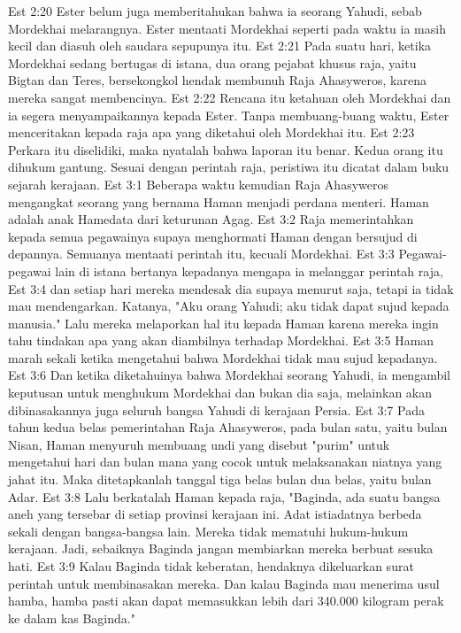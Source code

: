 Est 2:20  Ester belum juga memberitahukan bahwa ia seorang Yahudi, sebab Mordekhai melarangnya. Ester mentaati Mordekhai seperti pada waktu ia masih kecil dan diasuh oleh saudara sepupunya itu.
Est 2:21  Pada suatu hari, ketika Mordekhai sedang bertugas di istana, dua orang pejabat khusus raja, yaitu Bigtan dan Teres, bersekongkol hendak membunuh Raja Ahasyweros, karena mereka sangat membencinya.
Est 2:22  Rencana itu ketahuan oleh Mordekhai dan ia segera menyampaikannya kepada Ester. Tanpa membuang-buang waktu, Ester menceritakan kepada raja apa yang diketahui oleh Mordekhai itu.
Est 2:23  Perkara itu diselidiki, maka nyatalah bahwa laporan itu benar. Kedua orang itu dihukum gantung. Sesuai dengan perintah raja, peristiwa itu dicatat dalam buku sejarah kerajaan.
Est 3:1  Beberapa waktu kemudian Raja Ahasyweros mengangkat seorang yang bernama Haman menjadi perdana menteri. Haman adalah anak Hamedata dari keturunan Agag.
Est 3:2  Raja memerintahkan kepada semua pegawainya supaya menghormati Haman dengan bersujud di depannya. Semuanya mentaati perintah itu, kecuali Mordekhai.
Est 3:3  Pegawai-pegawai lain di istana bertanya kepadanya mengapa ia melanggar perintah raja,
Est 3:4  dan setiap hari mereka mendesak dia supaya menurut saja, tetapi ia tidak mau mendengarkan. Katanya, "Aku orang Yahudi; aku tidak dapat sujud kepada manusia." Lalu mereka melaporkan hal itu kepada Haman karena mereka ingin tahu tindakan apa yang akan diambilnya terhadap Mordekhai.
Est 3:5  Haman marah sekali ketika mengetahui bahwa Mordekhai tidak mau sujud kepadanya.
Est 3:6  Dan ketika diketahuinya bahwa Mordekhai seorang Yahudi, ia mengambil keputusan untuk menghukum Mordekhai dan bukan dia saja, melainkan akan dibinasakannya juga seluruh bangsa Yahudi di kerajaan Persia.
Est 3:7  Pada tahun kedua belas pemerintahan Raja Ahasyweros, pada bulan satu, yaitu bulan Nisan, Haman menyuruh membuang undi yang disebut "purim" untuk mengetahui hari dan bulan mana yang cocok untuk melaksanakan niatnya yang jahat itu. Maka ditetapkanlah tanggal tiga belas bulan dua belas, yaitu bulan Adar.
Est 3:8  Lalu berkatalah Haman kepada raja, "Baginda, ada suatu bangsa aneh yang tersebar di setiap provinsi kerajaan ini. Adat istiadatnya berbeda sekali dengan bangsa-bangsa lain. Mereka tidak mematuhi hukum-hukum kerajaan. Jadi, sebaiknya Baginda jangan membiarkan mereka berbuat sesuka hati.
Est 3:9  Kalau Baginda tidak keberatan, hendaknya dikeluarkan surat perintah untuk membinasakan mereka. Dan kalau Baginda mau menerima usul hamba, hamba pasti akan dapat memasukkan lebih dari 340.000 kilogram perak ke dalam kas Baginda."
